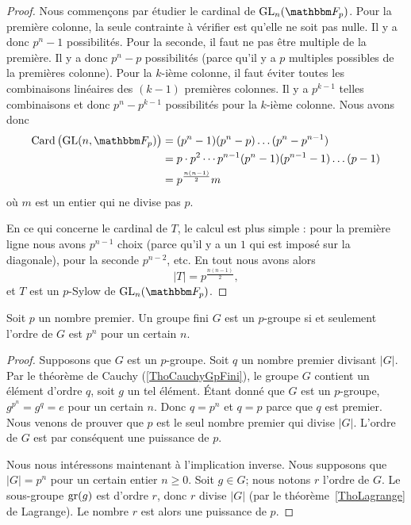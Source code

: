\begin{proof}
    Nous commençons par étudier le cardinal de \( \GL_n(\eF_p)\). Pour la première colonne, la seule contrainte à vérifier est qu'elle ne soit pas nulle. Il y a donc \( p^n-1\) possibilités. Pour la seconde, il faut ne pas être multiple de la première. Il y a donc \( p^n-p\) possibilités (parce qu'il y a \( p\) multiples possibles de la premières colonne). Pour la \( k\)-ième colonne, il faut éviter toutes les combinaisons linéaires des \( (k-1)\) premières colonnes. Il y a \( p^{k-1}\) telles combinaisons et donc \( p^n-p^{k-1}\) possibilités pour la \( k\)-ième colonne. Nous avons donc
    \begin{subequations}
        \begin{align}
            \Card\big( \GL(n,\eF_{p}) \big)&=(p^n-1)(p^n-p)\ldots(p^n-p^{n-1})\\
            &=p\cdot p^2\cdots p^{n-1}(p^n-1)(p^{n-1}-1)\ldots (p-1)\\
            &=p^{\frac{ n(n-1) }{2}}m
        \end{align}
    \end{subequations}
    où \( m\) est un entier qui ne divise pas \( p\).

    En ce qui concerne le cardinal de \( T\), le calcul est plus simple : pour la première ligne nous avons \( p^{n-1}\) choix (parce qu'il y a un \( 1\) qui est imposé sur la diagonale), pour la seconde \( p^{n-2}\), etc. En tout nous avons alors
    \begin{equation}
        | T |=p^{\frac{ n(n-1) }{2}},
    \end{equation}
    et \( T\) est un \( p\)-Sylow de \( \GL_n(\eF_p)\).
\end{proof}


\begin{proposition}
    Soit \( p\) un nombre premier. Un groupe fini \( G\) est un $p$-groupe si et seulement l'ordre de \( G\) est \( p^n\) pour un certain \( n\).
\end{proposition}

\begin{proof}
    Supposons que \( G\) est un $p$-groupe. Soit \( q\) un nombre premier divisant \( | G |\). Par le théorème de Cauchy (\ref{ThoCauchyGpFini}), le groupe \( G\) contient un élément d'ordre \( q\), soit \( g\) un tel élément. Étant donné que \( G\) est un $p$-groupe, \( g^{p^n}=g^q=e\) pour un certain \( n\). Donc $q=p^n$ et \( q=p\) parce que \( q\) est premier. Nous venons de prouver que \( p\) est le seul nombre premier qui divise \( | G |\). L'ordre de \( G\) est par conséquent une puissance de \( p\).

    Nous nous intéressons maintenant à l'implication inverse. Nous supposons que \( | G |=p^n\) pour un certain entier \( n\geq 0\). Soit \( g\in G\); nous notons \( r\) l'ordre de \( G\). Le sous-groupe \( \operatorname{gr}(g)\) est d'ordre \( r\), donc \( r\) divise \( | G |\) (par le théorème~\ref{ThoLagrange} de Lagrange). Le nombre \( r\) est alors une puissance de \( p\).
\end{proof}

